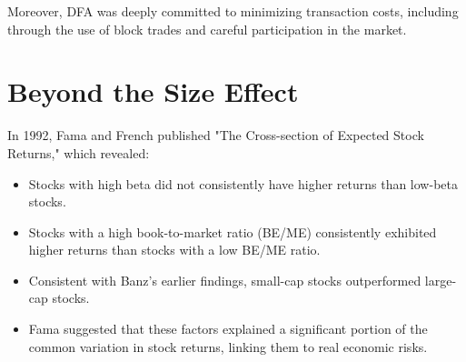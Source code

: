 \documentclass{article}
\begin{document}
Moreover, DFA was deeply committed to minimizing transaction costs, including through the use of block trades and careful participation in the market.

\section{Beyond the Size Effect}
In 1992, Fama and French published "The Cross-section of Expected Stock Returns," which revealed:

\begin{itemize}
    \item Stocks with high beta did not consistently have higher returns than low-beta stocks.
    \item Stocks with a high book-to-market ratio (BE/ME) consistently exhibited higher returns than stocks with a low BE/ME ratio.
    \item Consistent with Banz's earlier findings, small-cap stocks outperformed large-cap stocks.
    \item Fama suggested that these factors explained a significant portion of the common variation in stock returns, linking them to real economic risks.
\end{itemize}
\end{document}
